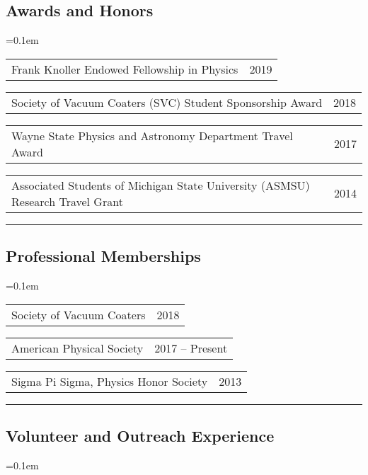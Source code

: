 \documentclass[10pt,letterpaper]{article}
\makeatletter
\newcommand{\headerrow}[2]
{\begin{tabular*}{\linewidth}{l@{\extracolsep{\fill}}r}
	#1 &
	#2 \\
\end{tabular*}}
\makeatother
\begin{document}
\subsection*{Awards and Honors}
	
	\begin{itemize*}
		\parskip=0.1em
		\item[]
			\headerrow
			{Frank Knoller Endowed Fellowship in Physics}
			{2019}

		\item[]
			\headerrow
			{Society of Vacuum Coaters (SVC) Student Sponsorship Award}
			{2018}

		\item[]
			\headerrow
			{Wayne State Physics and Astronomy Department Travel Award}
			{2017}

		\item[]
			\headerrow
			{Associated Students of Michigan State University (ASMSU) Research Travel Grant}
			{2014}
	\end{itemize*}

\hrule
\vspace{-0.4em}
\subsection*{Professional Memberships}

	\begin{itemize*}
		\parskip=0.1em
		\item[]
		\headerrow
			{Society of Vacuum Coaters}
			{2018}

		\item[]
		\headerrow
			{American Physical Society}
			{2017 -- Present}

		\item[]
		\headerrow
			{Sigma Pi Sigma, Physics Honor Society}
			{2013}

	\end{itemize*}

\hrule
\vspace{-0.4em}
\subsection*{Volunteer and Outreach Experience}

	\begin{itemize*}
		\parskip=0.1em
		\item[]

	\end{itemize*}
\end{document}
